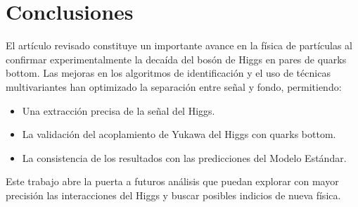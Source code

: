 \documentclass[a4paper,12pt]{article}
\begin{document}
\section{Conclusiones}
El artículo revisado constituye un importante avance en la física de partículas al confirmar experimentalmente la decaída del bosón de Higgs en pares de quarks bottom. Las mejoras en los algoritmos de identificación y el uso de técnicas multivariantes han optimizado la separación entre señal y fondo, permitiendo:
\begin{itemize}
    \item Una extracción precisa de la señal del Higgs.
    \item La validación del acoplamiento de Yukawa del Higgs con quarks bottom.
    \item La consistencia de los resultados con las predicciones del Modelo Estándar.
\end{itemize}
Este trabajo abre la puerta a futuros análisis que puedan explorar con mayor precisión las interacciones del Higgs y buscar posibles indicios de nueva física.
\end{document}
